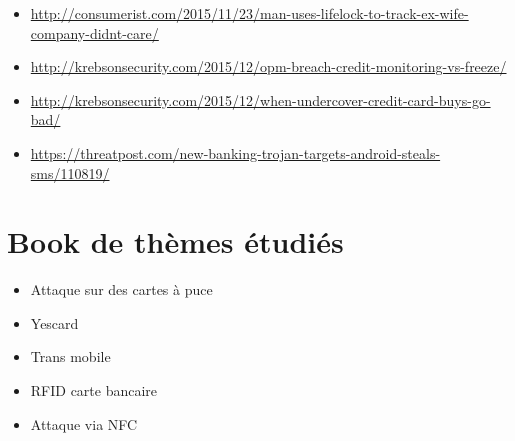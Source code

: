 \documentclass{article}
\begin{document}
\begin{itemize}
\bigskip
\item
\href{http://consumerist.com/2015/11/23/man-uses-lifelock-to-track-ex-wife-company-didnt-care/
}{http://consumerist.com/2015/11/23/man-uses-lifelock-to-track-ex-wife-company-didnt-care/
}

\bigskip
\item
\href{http://krebsonsecurity.com/2015/12/opm-breach-credit-monitoring-vs-freeze/
}{http://krebsonsecurity.com/2015/12/opm-breach-credit-monitoring-vs-freeze/
}

\bigskip
\item
\href{http://krebsonsecurity.com/2015/12/when-undercover-credit-card-buys-go-bad/
}{http://krebsonsecurity.com/2015/12/when-undercover-credit-card-buys-go-bad/
}

\bigskip
\item
\href{https://threatpost.com/new-banking-trojan-targets-android-steals-sms/110819/
}{https://threatpost.com/new-banking-trojan-targets-android-steals-sms/110819/
}

\end{itemize}

\newpage
\section{Book de thèmes étudiés}
\begin{itemize}
\item Attaque sur des cartes à puce
\item Yescard
\item Trans mobile 
\item RFID carte bancaire
\item Attaque via NFC
\end{itemize}
\end{document}
